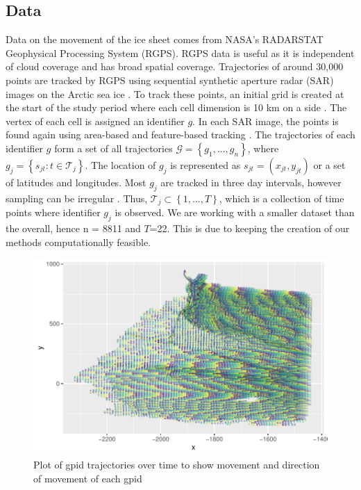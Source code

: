 \documentclass[12pt]{article}
\begin{document}
\hypertarget{data}{%
\subsection{Data}\label{data}}

Data on the movement of the ice sheet comes from NASA's RADARSTAT
Geophysical Processing System (RGPS). RGPS data is useful as it is
independent of cloud coverage and has broad spatial coverage.
Trajectories of around 30,000 points are tracked by RGPS using
sequential synthetic aperture radar (SAR) images on the Arctic sea ice
\citep{lindsay_radarstat_2003}. To track these points, an initial grid
is created at the start of the study period where each cell dimension is
10 km on a side \citep{kwok_seasonal_2002}. The vertex of each cell is
assigned an identifier \(g\). In each SAR image, the points is found
again using area-based and feature-based tracking
\citep{peterson_evaluating_2011}. The trajectories of each identifier
\(g\) form a set of all trajectories
\(\mathcal{G} =\left\{g_1,...,g_n\right\}\), where
\(g_j = \left\{s_{jt}: t \in \mathcal{T}_j\right\}\). The location of
\(g_j\) is represented as \(s_{jt} = (x_{jt}, y_{jt})\) or a set of
latitudes and longitudes. Most \(g_j\) are tracked in three day
intervals, however sampling can be irregular
\citep{peterson_evaluating_2011}. Thus,
\(\mathcal{T}_j \subset \left\{1,...,T\right\}\), which is a collection
of time points where identifier \(g_j\) is observed. We are working with
a smaller dataset than the overall, hence n = 8811 and \(T\)=22. This is
due to keeping the creation of our methods computationally feasible.

\begin{figure}[tbp]

{\centering \includegraphics[width=\linewidth,]{spatio-temporal-model-arctic-sea-ice_files/figure-latex/trajectories-1} 

}

\caption{Plot of gpid trajectories over time to show movement and direction of movement of each gpid}\label{fig:trajectories}
\end{figure}
\end{document}
